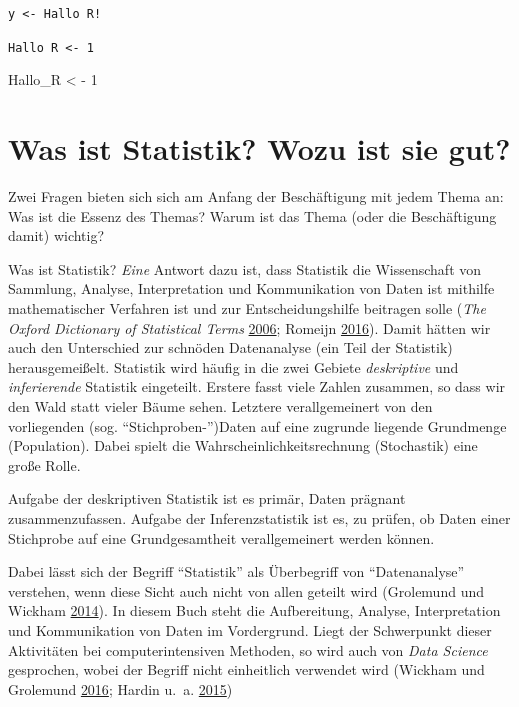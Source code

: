 \documentclass[12pt,ngerman,]{book}
\makeatletter
\newenvironment{Shaded}{\begin{snugshade}}{\end{snugshade}}
\newcommand{\DecValTok}[1]{\textcolor[rgb]{0.00,0.00,0.81}{{#1}}}
\newcommand{\StringTok}[1]{\textcolor[rgb]{0.31,0.60,0.02}{{#1}}}
\newcommand{\NormalTok}[1]{{#1}}
\newenvironment{kframe}{%
\medskip{}
\setlength{\fboxsep}{.8em}
 \def\at@end@of@kframe{}%
 \ifinner\ifhmode%
  \def\at@end@of@kframe{\end{minipage}}%
  \begin{minipage}{\columnwidth}%
 \fi\fi%
 \def\FrameCommand##1{\hskip\@totalleftmargin \hskip-\fboxsep
 \colorbox{shadecolor}{##1}\hskip-\fboxsep
     \hskip-\linewidth \hskip-\@totalleftmargin \hskip\columnwidth}%
 \MakeFramed {\advance\hsize-\width
   \@totalleftmargin\z@ \linewidth\hsize
   \@setminipage}}%
 {\par\unskip\endMakeFramed%
 \at@end@of@kframe}
\renewenvironment{Shaded}{\begin{kframe}}{\end{kframe}}
\makeatother
\begin{document}
\texttt{y\ \textless{}-\ Hallo\ R!}

\texttt{Hallo\ R\ \textless{}-\ 1}

\begin{Shaded}
\begin{Highlighting}[]
\NormalTok{Hallo_R <}\StringTok{ }\NormalTok{-}\StringTok{ }\DecValTok{1}
\end{Highlighting}
\end{Shaded}

\section{Was ist Statistik? Wozu ist sie
gut?}\label{was-ist-statistik-wozu-ist-sie-gut}

Zwei Fragen bieten sich sich am Anfang der Beschäftigung mit jedem Thema
an: Was ist die Essenz des Themas? Warum ist das Thema (oder die
Beschäftigung damit) wichtig?

Was ist Statistik? \emph{Eine} Antwort dazu ist, dass Statistik die
Wissenschaft von Sammlung, Analyse, Interpretation und Kommunikation von
Daten ist mithilfe mathematischer Verfahren ist und zur
Entscheidungshilfe beitragen solle (\emph{The Oxford Dictionary of
Statistical Terms} \protect\hyperlink{ref-oxford}{2006}; Romeijn
\protect\hyperlink{ref-sep-statistics}{2016}). Damit hätten wir auch den
Unterschied zur schnöden Datenanalyse (ein Teil der Statistik)
herausgemeißelt. Statistik wird häufig in die zwei Gebiete
\emph{deskriptive} und \emph{inferierende} Statistik eingeteilt. Erstere
fasst viele Zahlen zusammen, so dass wir den Wald statt vieler Bäume
sehen. Letztere verallgemeinert von den vorliegenden (sog.
``Stichproben-'')Daten auf eine zugrunde liegende Grundmenge
(Population). Dabei spielt die Wahrscheinlichkeitsrechnung (Stochastik)
eine große Rolle.

Aufgabe der deskriptiven Statistik ist es primär, Daten prägnant
zusammenzufassen. Aufgabe der Inferenzstatistik ist es, zu prüfen, ob
Daten einer Stichprobe auf eine Grundgesamtheit verallgemeinert werden
können.

Dabei lässt sich der Begriff ``Statistik'' als Überbegriff von
``Datenanalyse'' verstehen, wenn diese Sicht auch nicht von allen
geteilt wird (Grolemund und Wickham
\protect\hyperlink{ref-grolemund2014cognitive}{2014}). In diesem Buch
steht die Aufbereitung, Analyse, Interpretation und Kommunikation von
Daten im Vordergrund. Liegt der Schwerpunkt dieser Aktivitäten bei
computerintensiven Methoden, so wird auch von \emph{Data Science}
gesprochen, wobei der Begriff nicht einheitlich verwendet wird (Wickham
und Grolemund \protect\hyperlink{ref-r4ds}{2016}; Hardin u.~a.
\protect\hyperlink{ref-hardin2015data}{2015})
\end{document}
